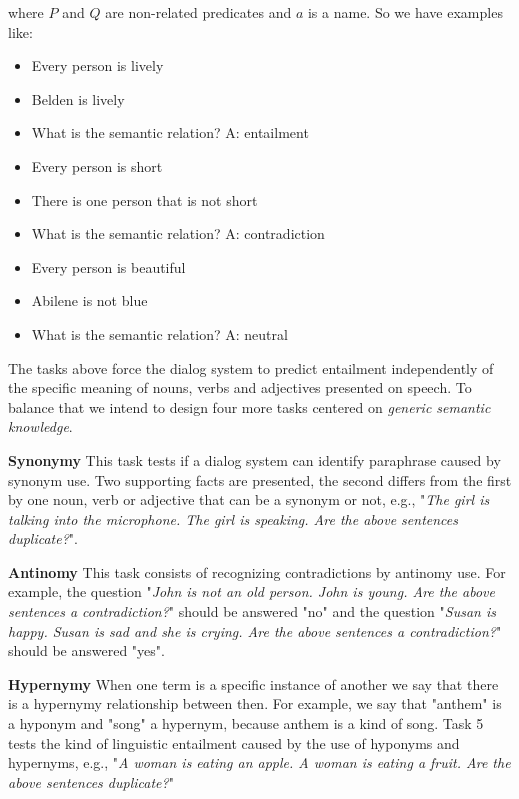 where $P$ and $Q$ are non-related predicates and $a$ is a name. So we have examples like:

\begin{itemize} 
\item[] Every person is lively
\item[] Belden is lively
\item[] What is the semantic relation? A: entailment
\end{itemize}

\begin{itemize} 
\item[] Every person is short
\item[] There is one person that is not short
\item[] What is the semantic relation?  A: contradiction
\end{itemize}

\begin{itemize} 
\item[] Every person is beautiful
\item[] Abilene is not blue
\item[] What is the semantic relation? A: neutral
\end{itemize}


The tasks above force the dialog system to predict entailment independently of the specific meaning of nouns, verbs and adjectives presented on speech. To balance that we intend to design four more tasks centered on \textit{generic semantic knowledge}.

\textbf{Synonymy} This task tests if a dialog system can identify paraphrase caused by synonym use. Two supporting facts are presented, the second differs from the first by one noun, verb or adjective that can be a synonym or not, e.g., "\textit{The girl is talking into the microphone. The girl is speaking. Are the above sentences duplicate?}".   


\textbf{Antinomy} This task consists of recognizing contradictions by antinomy use. For example, the question "\textit{John is not an old person. John is young. Are the above sentences a contradiction?}" should be answered "no" and the question "\textit{Susan is happy. Susan is sad and she is crying. Are the above sentences a contradiction?}" should be answered "yes".

\textbf{Hypernymy} When one term is a specific instance of another we say that there is a hypernymy relationship between then. For example, we say that "anthem" is a hyponym and "song" a hypernym, because anthem is a kind of song. Task 5 tests the kind of linguistic entailment caused by the use of hyponyms and hypernyms, e.g., "\textit{A woman is eating an apple. A woman is eating a fruit. Are the above sentences duplicate?}"



